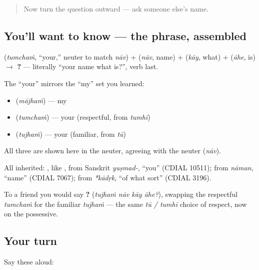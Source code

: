 \begin{quote}
Now turn the question outward — ask someone else's name.
\end{quote}

\subsection*{You'll want to know — the phrase, assembled}
\textbf{} (\emph{tumchaṁ}, \textquotedblleft{}your,\textquotedblright{} neuter to match \emph{nāv}) + \textbf{} (\emph{nāv}, name) + \textbf{} (\emph{kāy}, what) + \textbf{} (\emph{āhe}, is) $\to$ \textbf{   ?} — literally \textquotedblleft{}your name what is?\textquotedblright{}, verb last.

The \textquotedblleft{}your\textquotedblright{} mirrors the \textquotedblleft{}my\textquotedblright{} set you learned:

\begin{itemize}
\raggedright
  \item \textbf{} (\emph{mājhaṁ}) — my
  \item \textbf{} (\emph{tumchaṁ}) — your (respectful, from \emph{tumhī})
  \item \textbf{} (\emph{tujhaṁ}) — your (familiar, from \emph{tū})
\end{itemize}

All three are shown here in the neuter, agreeing with the neuter \textbf{} (\emph{nāv}).

\begin{cousinweb}
All inherited: \textbf{}, like \textbf{}, from Sanskrit \emph{yuṣmad-}, \textquotedblleft{}you\textquotedblright{} (CDIAL 10511); \textbf{} from \emph{nāman}, \textquotedblleft{}name\textquotedblright{} (CDIAL 7067); \textbf{} from \emph{*kādṛk}, \textquotedblleft{}of what sort\textquotedblright{} (CDIAL 3196).
\end{cousinweb}

\begin{culture}
To a friend you would say \textbf{   ?} (\emph{tujhaṁ nāv kāy āhe?}), swapping the respectful \emph{tumchaṁ} for the familiar \emph{tujhaṁ} — the same \emph{tū / tumhī} choice of respect, now on the possessive.
\end{culture}

\subsection*{Your turn}
Say these aloud:

